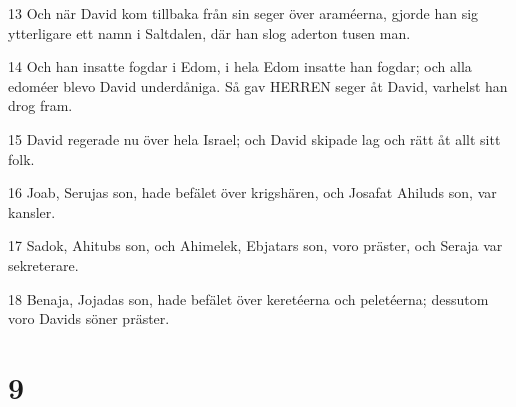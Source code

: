\par 13 Och när David kom tillbaka från sin seger över araméerna, gjorde han sig ytterligare ett namn i Saltdalen, där han slog aderton tusen man.
\par 14 Och han insatte fogdar i Edom, i hela Edom insatte han fogdar; och alla edoméer blevo David underdåniga. Så gav HERREN seger åt David, varhelst han drog fram.
\par 15 David regerade nu över hela Israel; och David skipade lag och rätt åt allt sitt folk.
\par 16 Joab, Serujas son, hade befälet över krigshären, och Josafat Ahiluds son, var kansler.
\par 17 Sadok, Ahitubs son, och Ahimelek, Ebjatars son, voro präster, och Seraja var sekreterare.
\par 18 Benaja, Jojadas son, hade befälet över keretéerna och peletéerna; dessutom voro Davids söner präster.

\chapter{9}

